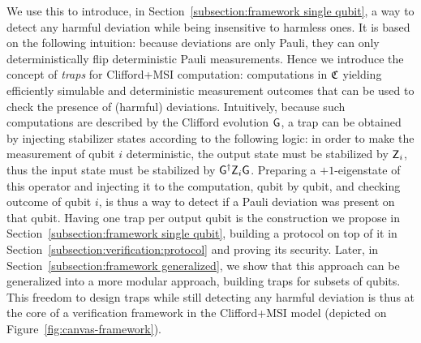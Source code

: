 We use this to introduce, in Section~\ref{subsection:framework single qubit},
a way to detect any harmful deviation while being insensitive to harmless ones.
It is based on the following intuition: because deviations are only Pauli, they can only deterministically flip deterministic Pauli measurements. Hence we introduce the concept of \emph{traps} for Clifford+MSI computation: computations in $\mathfrak C$ yielding efficiently simulable and deterministic measurement outcomes that can be used to check the presence of (harmful) deviations.
Intuitively, because such computations are described by the Clifford evolution $\mathsf{G}$, a trap can be obtained by injecting stabilizer states according to the following logic: in order to make the measurement of qubit $i$ deterministic, the output state must be stabilized by $\mathsf{Z}_i$, thus the input state must be stabilized by $\mathsf{G}^\dagger \mathsf{Z}_i\mathsf{G}$. Preparing a $+1$-eigenstate of this operator and injecting it to the computation, qubit by qubit, and checking outcome of qubit $i$, is thus a way to detect if a Pauli deviation was present on that qubit. Having one trap per output qubit is the construction we propose in Section~\ref{subsection:framework single qubit}, building a protocol on top of it in Section~\ref{subsection:verification:protocol} and proving its security. Later, in Section~\ref{subsection:framework generalized}, we show that this approach can be generalized into a more modular approach, building traps for subsets of qubits. This freedom to design traps while still detecting any harmful deviation is thus at the core of a verification framework in the Clifford+MSI model (depicted on Figure~\ref{fig:canvas-framework}).

